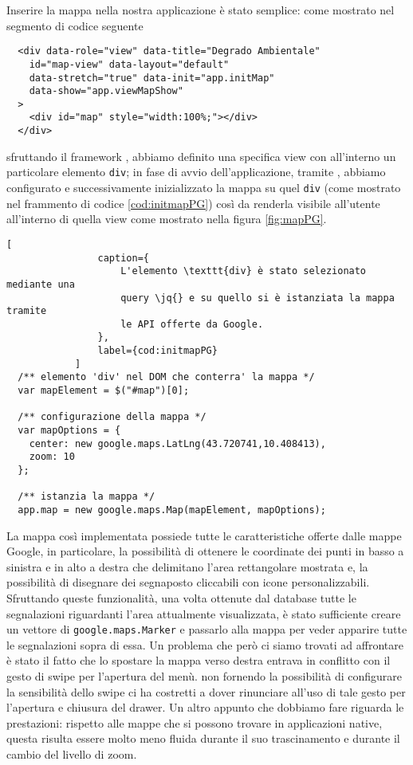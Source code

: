             Inserire la mappa nella nostra applicazione \pg{} è stato semplice:
            come mostrato nel segmento di codice seguente
            \begin{lstlisting}
  <div data-role="view" data-title="Degrado Ambientale"
    id="map-view" data-layout="default"
    data-stretch="true" data-init="app.initMap"
    data-show="app.viewMapShow"
  >
    <div id="map" style="width:100%;"></div>
  </div>
            \end{lstlisting}
            sfruttando il framework \kendomob{}, abbiamo definito una specifica
            view con all'interno un particolare elemento \texttt{div}; in fase di
            avvio dell'applicazione, tramite \js{}, abbiamo configurato e
            successivamente inizializzato la mappa su quel \texttt{div} (come
            mostrato nel frammento di codice \ref{cod:initmapPG}) così
            da renderla visibile all'utente all'interno di quella view come
            mostrato nella figura \ref{fig:mapPG}.
            \begin{lstlisting}[
                caption={
                    L'elemento \texttt{div} è stato selezionato mediante una
                    query \jq{} e su quello si è istanziata la mappa tramite
                    le API offerte da Google.
                },
                label={cod:initmapPG}
            ]
  /** elemento 'div' nel DOM che conterra' la mappa */
  var mapElement = $("#map")[0];

  /** configurazione della mappa */
  var mapOptions = {
    center: new google.maps.LatLng(43.720741,10.408413),
    zoom: 10
  };

  /** istanzia la mappa */
  app.map = new google.maps.Map(mapElement, mapOptions);
            \end{lstlisting}
            La mappa così implementata possiede tutte le caratteristiche offerte
            dalle mappe Google, in particolare, la possibilità di ottenere le
            coordinate dei punti in basso a sinistra e in alto a destra che
            delimitano l'area rettangolare mostrata e, la possibilità di
            disegnare dei segnaposto cliccabili con icone personalizzabili.
            Sfruttando queste funzionalità, una volta ottenute dal database
            tutte le segnalazioni riguardanti l'area attualmente visualizzata, è
            stato sufficiente creare un vettore di \texttt{google.maps.Marker} e
            passarlo alla mappa per veder apparire tutte le segnalazioni sopra
            di essa. Un problema che però ci siamo trovati ad affrontare è stato
            il fatto che lo spostare la mappa verso destra entrava in conflitto
            con il gesto di swipe per l'apertura del menù. \kendomob{} non
            fornendo la possibilità di configurare la sensibilità dello swipe ci
            ha costretti a dover rinunciare all'uso di tale gesto per l'apertura
            e chiusura del drawer. Un altro appunto che dobbiamo fare riguarda
            le prestazioni: rispetto alle mappe che si possono trovare in
            applicazioni native, questa risulta essere molto meno fluida durante
            il suo trascinamento e durante il cambio del livello di zoom.

